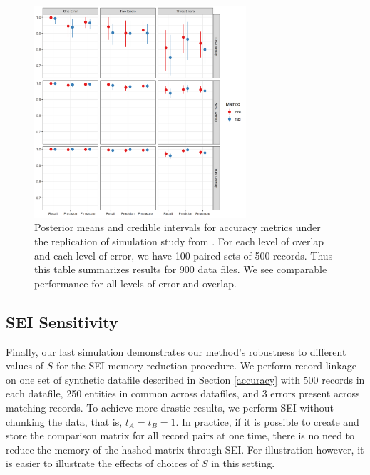 \documentclass[ba]{imsart}
\begin{document}
	\begin{figure}[t]
		\begin{center}
			\includegraphics[width=0.7\textwidth]{../notes/figures/sadinle_sim_plot2} 
			\caption{Posterior means and credible intervals for accuracy metrics under the replication of simulation study from \cite{sadinle_bayesian_2017}. For each level of overlap and each level of error, we have 100 paired sets of 500 records. Thus this table summarizes results for 900 data files. We see comparable performance for all levels of error and overlap.}
			\label{fig:sadinle_simulation}
		\end{center}
	\end{figure}

	\hypertarget{SEI-sensitivity}{%
	\subsection{SEI Sensitivity}\label{SEI-sensitivity}}

Finally, our last simulation demonstrates our method's robustness to different values of $S$ for the SEI memory reduction procedure. We perform record linkage on one set of synthetic datafile described in Section \ref{accuracy} with 500 records in each datafile, 250 entities in common across datafiles, and 3 errors present across matching records. To achieve more drastic results, we perform SEI without chunking the data, that is, $t_A = t_B = 1$. In practice, if it is possible to create and store the comparison matrix for all record pairs at one time, there is no need to reduce the memory of the hashed matrix through SEI. For illustration however, it is easier to illustrate the effects of choices of $S$ in this setting. 
\end{document}
